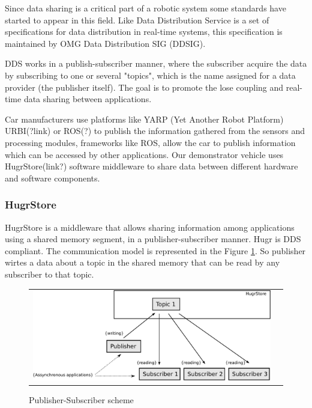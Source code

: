 Since data sharing is a critical part of a robotic system some standards have started to appear in this field. Like Data Distribution Service\cite{dds} is a set of specifications for data distribution in real-time systems, this specification is maintained by OMG Data Distribution SIG (DDSIG).

DDS works in a publish-subscriber manner, where the subscriber acquire the data by subscribing to one or several  "topics", which is the name assigned for a data provider (the publisher itself). The goal is to promote the lose coupling and real-time data sharing between applications.

Car manufacturers use platforms like YARP (Yet Another Robot Platform) URBI(?link) or ROS(?) to publish the information gathered from the sensors and processing modules, frameworks like ROS, allow the car to publish information  which can be accessed by other applications.%
Our demonstrator vehicle uses HugrStore(link?) software middleware to share data between different hardware and software components.


\subsubsection*{HugrStore}
HugrStore is a middleware that allows sharing information among applications using a shared memory segment, in a publisher-subscriber manner. Hugr is DDS compliant. The communication model is represented in the Figure \ref{fig:dds:hugr}. So publisher wirtes a data about a topic in the shared memory that can be read by any subscriber to that topic.

\begin{figure}[H]
   \centering
     \begin{tabular}{lr}
       \includegraphics[scale=0.50]{img/fig:dds:hugr}
     \end{tabular}
   \caption{Publisher-Subscriber scheme}
   \label{fig:dds:hugr}
\end{figure}

